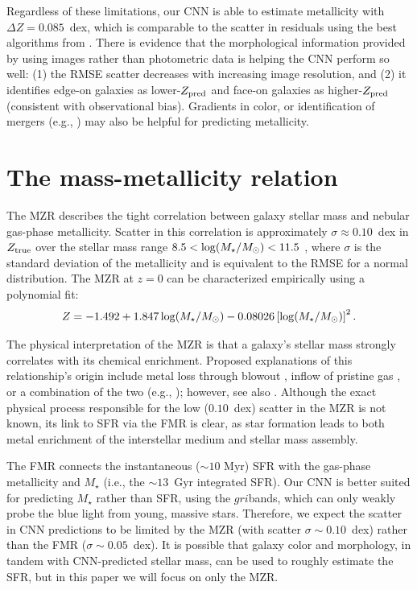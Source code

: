 \documentclass[fleqn,usenatbib]{mnras}
\newcommand{\sdssg}{\hbox{$g$}}
\newcommand{\sdssr}{\hbox{$r$}}
\newcommand{\sdssi}{\hbox{$i$}}
\newcommand{\mstar}{\hbox{$M_{\star}$}}
\newcommand{\msol}{\hbox{$M_\odot$}}
\newcommand{\eg}{e.g.}
\newcommand{\ie}{i.e.}
\newcommand{\citeeg}[1]{(\eg, \citealt{#1})}
\begin{document}
Regardless of these limitations, our CNN is able to estimate metallicity with $\Delta Z = 0.085$~dex, which is comparable to the scatter in residuals using the best algorithms from \cite{Acquaviva2016}. There is evidence that the morphological information provided by using images rather than photometric data is helping the CNN perform so well: (1) the RMSE scatter decreases with increasing image resolution, and (2) it identifies edge-on galaxies as lower-$Z_{\rm pred}$ and face-on galaxies as higher-$Z_{\rm pred}$ (consistent with observational bias). Gradients in color, or identification of mergers \citeeg{Ackermann2018} may also be helpful for predicting metallicity.


\section{The mass-metallicity relation} \label{sec:MZR}
The MZR describes the tight correlation between galaxy stellar mass and nebular gas-phase metallicity. Scatter in this correlation is approximately $\sigma \approx 0.10$~dex in $Z_{\rm true}$ over the stellar mass range $8.5 < \log (\mstar / \msol) < 11.5$ \citep{Tremonti2004}, where $\sigma$ is the standard deviation of the metallicity and is equivalent to the RMSE for a normal distribution. The MZR at $z=0$ can be characterized empirically using a polynomial fit:
\begin{equation}\label{eq:mzr}
Z = -1.492 + 1.847 \log (\mstar / \msol) - 0.08026 \left [\log(\mstar / \msol)\right ]^2.
\end{equation}

The physical interpretation of the MZR is that a galaxy's stellar mass strongly correlates with its chemical enrichment. Proposed explanations of this relationship's origin include metal loss through blowout \citep[see, e.g.,][]{2002ApJ...581.1019G,Tremonti2004,Brooks2007,Dave2012}, inflow of pristine gas \cite{Dalcanton2004}, or a combination of the two \citeeg{2013ApJ...772..119L}; however, see also \cite{2013A&A...554A..58S}. Although the exact physical process responsible for the low ($0.10$~dex) scatter in the MZR is not known, its link to SFR via the FMR is clear, as star formation leads to both metal enrichment of the interstellar medium and stellar mass assembly.

The FMR connects the instantaneous ($\sim 10$ Myr) SFR with the gas-phase metallicity \citep[$\sim 1$~Gyr timescales; see, e.g.,][]{2011ApJ...734...48L} and \mstar{} (\ie, the $\sim 13$~Gyr integrated SFR). Our CNN is better suited for predicting \mstar{} rather than SFR, using the \sdssg\sdssr\sdssi bands, which can only weakly probe the blue light from young, massive stars. Therefore, we expect the scatter in CNN predictions to be limited by the MZR (with scatter $\sigma \sim 0.10$~dex) rather than the FMR ($\sigma \sim 0.05$~dex). It is possible that galaxy color and morphology, in tandem with CNN-predicted stellar mass, can be used to roughly estimate the SFR, but in this paper we will focus on only the MZR.
\end{document}

